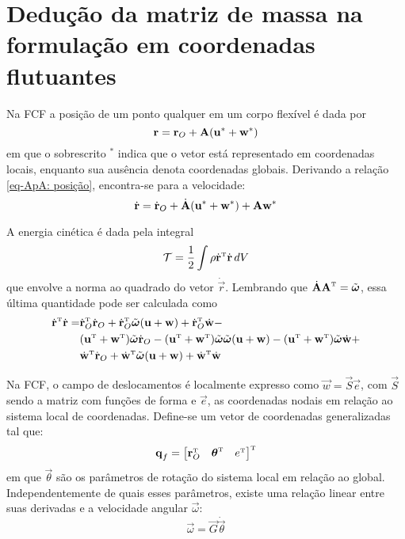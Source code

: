 \chapter{Dedução da matriz de massa na formulação em coordenadas
flutuantes \label{ch:apendice A}}

Na FCF a posição de um ponto qualquer em um corpo flexível é dada por
\begin{equation}
 \vec{r} = \vec{r}_O +  \tens{A}(\vec{u}^* + \vec{w}^*) \label{eq-ApA: posição}
\end{equation}
em que o sobrescrito $^*$ indica que o vetor está representado em coordenadas
locais, enquanto sua ausência denota coordenadas globais. Derivando a relação
\eqref{eq-ApA: posição}, encontra-se para a velocidade:
\begin{equation}
 \dot{\vec{r}} = \dot{\vec{r}}_O +  \dot{\tens{A}}(\vec{u}^* + \vec{w}^*) +
\tens{A}\vec{w}^* \label{eq-ApA: velocidade}
\end{equation}

A energia cinética é dada pela integral
\begin{equation}
 \mathcal{T} = \frac{1}{2} \int{\rho \tp{\dot{\vec{r}}} \dot{\vec{r}} \, dV}
\end{equation}
que envolve a norma ao quadrado do vetor $\dot{\vec{r}}$. Lembrando que
$\dot{\tens{A}}\tp{\tens{A}} = \tilde{\vec{\omega}}$, essa última quantidade
pode ser calculada como
\begin{align}
 \tp{\dot{\vec{r}}}\dot{\vec{r}} =&  \tp{\dot{\vec{r}}}_O\dot{\vec{r}}_O
+ \tp{\dot{\vec{r}}}_O \tilde{\vec{\omega}}(\vec{u} + \vec{w}) +
\tp{\dot{\vec{r}}}_O \dot{\vec{w}} - \\
&(\tp{\vec{u}} + \tp{\vec{w}})\tilde{\vec{\omega}}\dot{\vec{r}}_O -
(\tp{\vec{u}}
+ \tp{\vec{w}})\tilde{\vec{\omega}}\tilde{\vec{\omega}}(\vec{u} + \vec{w})
- (\tp{\vec{u}} + \tp{\vec{w}})\tilde{\vec{\omega}}\dot{\vec{w}} + \\
&\tp{\dot{\vec{w}}}\dot{\vec{r}}_O +
\tp{\dot{\vec{w}}}\tilde{\vec{\omega}}(\vec{u}+\vec{w}) +
\tp{\dot{\vec{w}}}\dot{\vec{w}} \label{eq:apA - rr passo 1}
\end{align}

Na FCF, o campo de deslocamentos é localmente expresso como $\vec{w}
= \vec{S}\vec{e}$, com  $\vec{S}$ sendo a matriz com funções de forma e
$\vec{e}$, as coordenadas nodais em relação ao sistema local de coordenadas.
Define-se um vetor de coordenadas generalizadas tal que:
\begin{equation}
 \vec{q}_f = \tp{\begin{bmatrix}
                      \tp{\vec{r}}_O & \tp{\vec{\theta}} & \tp{e}
                     \end{bmatrix}}
\end{equation}
em que $\vec{\theta}$ são os parâmetros de rotação do sistema local em relação
ao global. Independentemente de quais esses parâmetros, existe uma relação
linear entre suas derivadas e a velocidade angular $\vec{\omega}$:
\begin{equation}
 \vec{\omega} = \vec{G}\dot{\vec{\theta}} \label{eq-ApA:theta-pt para omega}
\end{equation}

